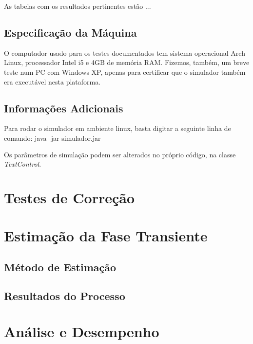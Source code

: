 \documentclass[a4paper,12pt]{report}
\begin{document}
As tabelas com os resultados pertinentes estão ...%

\section{Especificação da Máquina}
O computador usado para os testes documentados tem sistema operacional Arch Linux, processador Intel i5 e 4GB de memória RAM. Fizemos, também, um breve teste num PC com Windows XP, apenas para certificar que o simulador também era executável nesta plataforma.

\section{Informações Adicionais}
Para rodar o simulador em ambiente linux, basta digitar a seguinte linha de comando:
java -jar simulador.jar

Os parâmetros de simulação podem ser alterados no próprio código, na classe \textit{TextControl}.

\chapter{Testes de Correção}


\chapter{Estimação da Fase Transiente}

\section{Método de Estimação}

\section{Resultados do Processo}

\chapter{Análise e Desempenho}


\end{document}
